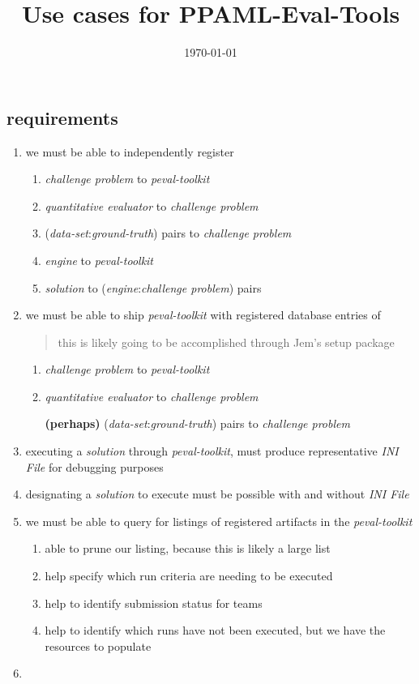 \documentclass[8pt,letterpaper]{article} %
\title{Use cases for PPAML-Eval-Tools}
\date{\today}
\newenvironment{slimlist}{
  \begin{enumerate}
    \setlength{\topsep}{0pt}
    \setlength{\itemsep}{1pt}
    \setlength{\parsep}{0pt}
    \setlength{\parskip}{0pt}
}{\end{enumerate}}
\newenvironment{mitemize}[1]{
  \subsection*{#1}
  \begin{slimlist}
}{
\end{slimlist}
\vspace{1em}
\pagebreak
}
\newcommand{\form}[1]{{\em #1}\xspace}
\newcommand{\pair}[2]{(#1:#2) pairs\xspace}
\def\ptk{\form{peval-toolkit}}
\def\cp{\form{challenge problem}}
\def\tev{\form{quantitative evaluator}}
\def\ds{\form{data-set}}
\def\gs{\form{ground-truth}}
\def\sol{\form{solution}}
\def\eng{\form{engine}}
\def\desc{\form{INI File}}
\begin{document}
\pagestyle{empty}
\clearpage%

\begin{mitemize}{requirements}
\item we must be able to independently register
  \begin{enumerate}
  \item \cp to \ptk
  \item \tev to \cp
  \item \pair{\ds}{\gs} to \cp
  \item \eng to \ptk
  \item \sol to \pair{\eng}{\cp}
  \end{enumerate}
\item we must be able to ship \ptk with registered database entries of
  \begin{quote}
    this is likely going to be accomplished through Jem's setup package
  \end{quote}
  \begin{enumerate}
  \item \cp to \ptk
  \item \tev to \cp
  \item[{\bf(perhaps)}] \pair{\ds}{\gs} to \cp
  \end{enumerate}
\item executing a \sol through \ptk, must produce representative \desc for debugging purposes
\item designating a \sol to execute must be possible with and without \desc
\item we must be able to query for listings of registered artifacts in the \ptk
  \begin{enumerate}
  \item able to prune our listing, because this is likely a large list
  \item help specify which run criteria are needing to be executed
  \item help to identify submission status for teams
  \item help to identify which runs have not been executed, but we have the resources to populate
  \end{enumerate}
\item 
\end{mitemize}
\end{document}

